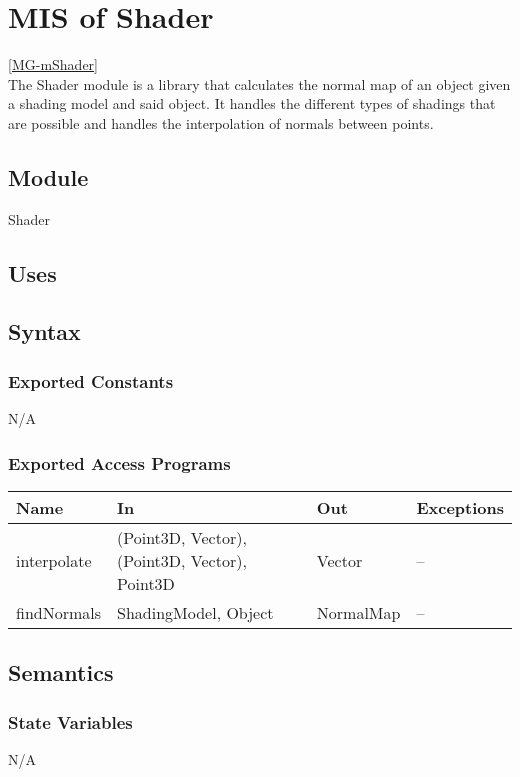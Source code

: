 \documentclass[12pt, titlepage]{article}
\begin{document}
\newpage

\section{MIS of Shader} \ref{MG-mShader} \\
The Shader module is a library that calculates the normal map of an object 
given a shading model and said object. It handles the different types of 
shadings that are possible and handles the interpolation of normals between 
points.

\subsection{Module}
Shader

\subsection{Uses}

\subsection{Syntax}
\subsubsection{Exported Constants}
N/A
\subsubsection{Exported Access Programs}
\begin{center}
	\begin{tabular}{p{3cm} p{4cm} p{2cm} p{4cm}}
		\hline
		\textbf{Name} & \textbf{In} & \textbf{Out} & \textbf{Exceptions} \\
		\hline
		interpolate & (Point3D, Vector), (Point3D, Vector), Point3D & Vector & 
		-- \\
		findNormals & ShadingModel, Object & NormalMap & -- \\
		\hline
	\end{tabular}
\end{center}

\subsection{Semantics}
\subsubsection{State Variables}
N/A
\end{document}
